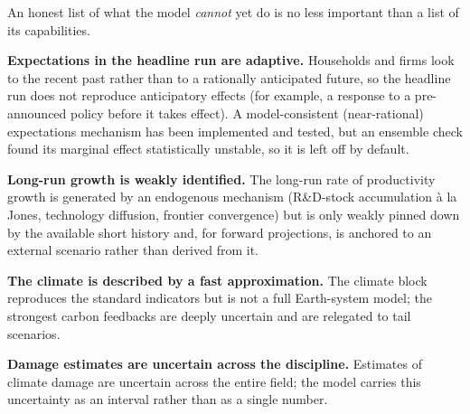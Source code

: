 \documentclass[a4paper,fleqn]{cas-sc}
\newcommand{\response}[1]{\medskip\noindent\textcolor{blue}{\small\itshape [Addressed: #1]}\medskip}
\begin{document}

An honest list of what the model \emph{cannot} yet do is no less important than a list of its
capabilities.

\textbf{Expectations in the headline run are adaptive.} Households and firms look to the recent past
rather than to a rationally anticipated future, so the headline run does not reproduce anticipatory
effects (for example, a response to a pre-announced policy before it takes effect). A model-consistent
(near-rational) expectations mechanism has been implemented and tested, but an ensemble check found its
marginal effect statistically unstable, so it is left off by default.

\textbf{Long-run growth is weakly identified.} The long-run rate of productivity growth is generated
by an endogenous mechanism (R\&D-stock accumulation à la Jones, technology diffusion, frontier
convergence) but is only weakly pinned down by the available short history and, for forward
projections, is anchored to an external scenario rather than derived from it.

\textbf{The climate is described by a fast approximation.} The climate block reproduces the standard
indicators but is not a full Earth-system model; the strongest carbon feedbacks are deeply uncertain
and are relegated to tail scenarios.

\textbf{Damage estimates are uncertain across the discipline.} Estimates of climate damage are
uncertain across the entire field; the model carries this uncertainty as an interval rather than as
a single number.
\end{document}
